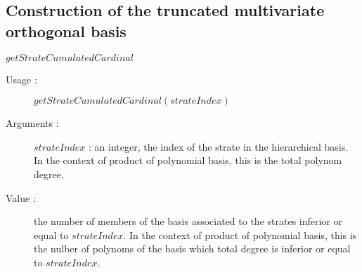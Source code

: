    \subsection{Construction of the truncated multivariate orthogonal basis}
\begin{description}
    \bigskip
  \item $getStrateCumulatedCardinal$
    \begin{description}
    \item[Usage :] $getStrateCumulatedCardinal(strateIndex)$
    \item[Arguments :] $strateIndex$ : an integer, the index of the strate in the hierarchical basis. In the context of product of polynomial basis, this is the total polynom degree.
    \item[Value :] the number of members of the basis associated to the  strates inferior or equal to $strateIndex$. In the context of product of polynomial basis, this is the nulber of polynoms of the basis which total degree is inferior or equal to $strateIndex$.
    \end{description}

  \end{description}
